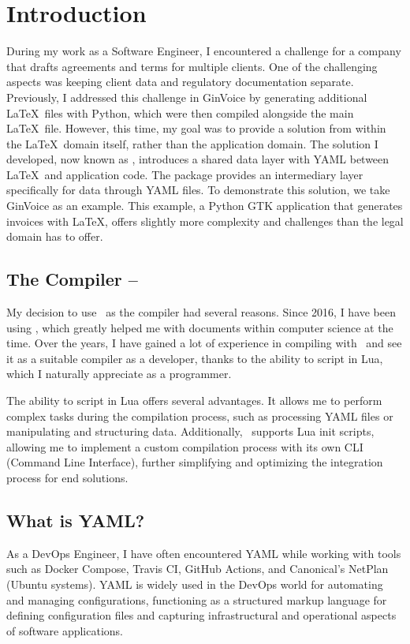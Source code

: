 \section{Introduction}
During my work as a Software Engineer, I encountered a challenge for a company that drafts agreements and terms for multiple clients.
One of the challenging aspects was keeping client data and regulatory documentation separate.
Previously, I addressed this challenge in GinVoice\cite{ginvoice} by generating additional \LaTeX\ files with Python, which were then compiled alongside the main \LaTeX\ file.
However, this time, my goal was to provide a solution from within the \LaTeX\ domain itself, rather than the application domain.
The solution I developed, now known as \cite{lua-placeholders}, introduces a shared data layer with YAML between \LaTeX\ and application code.
The package provides an intermediary layer specifically for data through YAML files.
To demonstrate this solution, we take GinVoice as an example.
This example, a Python GTK application that generates invoices with \LaTeX, offers slightly more complexity and challenges than the legal domain has to offer.

\subsection{The Compiler -- \LuaLaTeX}
My decision to use \LuaLaTeX\ as the compiler had several reasons.
Since 2016, I have been using \LuaLaTeX, which greatly helped me with documents within computer science at the time.
Over the years, I have gained a lot of experience in compiling with \LuaLaTeX\ and see it as a suitable compiler as a developer, thanks to the ability to script in Lua, which I naturally appreciate as a programmer.

The ability to script in Lua offers several advantages.
It allows me to perform complex tasks during the compilation process, such as processing YAML files or manipulating and structuring data. Additionally, \LuaLaTeX\ supports Lua init scripts, allowing me to implement a custom compilation process with its own CLI (Command Line Interface), further simplifying and optimizing the integration process for end solutions.

\subsection{What is YAML?}
As a DevOps Engineer, I have often encountered YAML while working with tools such as Docker Compose, Travis CI, GitHub Actions, and Canonical's NetPlan (Ubuntu systems).
YAML is widely used in the DevOps world for automating and managing configurations, functioning as a structured markup language for defining configuration files and capturing infrastructural and operational aspects of software applications.

